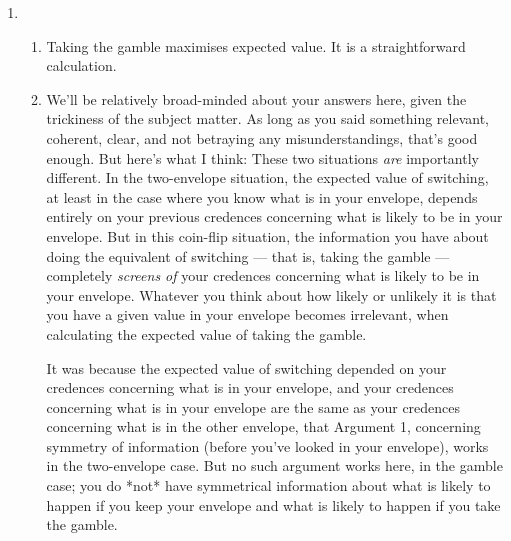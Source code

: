 \documentclass[12pt,a4paper]{article}
\begin{document}
\begin{enumerate}
\item  \begin{enumerate}
	\item Taking the gamble maximises expected value. It is a straightforward calculation.
	\item We'll be relatively broad-minded about your answers here, given the trickiness of the subject matter. As long as you said something relevant, coherent, clear, and not betraying any misunderstandings, that's good enough. But here's what I think: These two situations \emph{are} importantly different. In the two-envelope situation, the expected value of switching, at least in the case where you know what is in your envelope, depends entirely on your previous credences concerning what is likely to be in your envelope. But in this coin-flip situation, the information you have about doing the equivalent of switching --- that is, taking the gamble --- completely \emph{screens of} your credences concerning what is likely to be in your envelope. Whatever you think about how likely or unlikely it is that you have a given value in your envelope becomes irrelevant, when calculating the expected value of taking the gamble.
	
	It was because the expected value of switching depended on your credences concerning what is in your envelope, and your credences concerning what is in your envelope are the same as your credences concerning what is in the other envelope, that Argument 1, concerning symmetry of information (before you've looked in your envelope), works in the two-envelope case. But no such argument works here, in the gamble case; you do *not* have symmetrical information about what is likely to happen if you keep your envelope and what is likely to happen if you take the gamble.
	\end{enumerate}

\end{enumerate}
\end{document}
